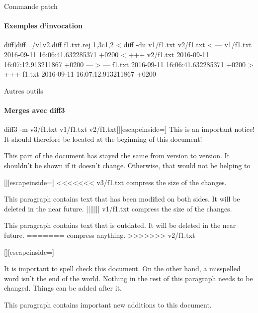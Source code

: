 \begin{frame}[fragile]{Commande patch}
\framesubtitle{Exemples d'invocation}
 \begin{snvlisting}[[normal]diff]{diff ../v1v2.diff f1.txt.rej}
1,3c1,2
< diff -du v1/f1.txt v2/f1.txt
< --- v1/f1.txt 2016-09-11 16:06:41.632285371 +0200
< +++ v2/f1.txt 2016-09-11 16:07:12.913211867 +0200
---
> --- f1.txt    2016-09-11 16:06:41.632285371 +0200
> +++ f1.txt    2016-09-11 16:07:12.913211867 +0200
 \end{snvlisting}
\end{frame}

\begin{frame}[fragile]{Autres outils}
\framesubtitle{Merges avec diff3}
\begin{tcbraster}[raster columns=3, raster valign=top]
\begin{snvlisting}{diff3 -m v3/f1.txt v1/f1.txt v2/f1.txt}[][escapeinside={}]
This is an important
notice! It should
therefore be located at
the beginning of this
document!

This part of the
document has stayed the
same from version to
version.  It shouldn't
be shown if it doesn't
change.  Otherwise, that
would not be helping to
\end{snvlisting}
\begin{snvlisting}{}[][escapeinside={}]
<<<<<<< v3/f1.txt
compress the size of the
changes.

This paragraph contains
text that has been
modified on both sides.
It will be deleted in the
near future.
||||||| v1/f1.txt
compress the size of the
changes.

This paragraph contains
text that is outdated.
It will be deleted in the
near future.
=======
compress anything.
>>>>>>> v2/f1.txt
\end{snvlisting}
\begin{snvlisting}{}[][escapeinside={}]

It is important to spell
check this document. On
the other hand, a
misspelled word isn't
the end of the world.
Nothing in the rest of
this paragraph needs to
be changed. Things can
be added after it.

This paragraph contains
important new additions
to this document.
\end{snvlisting}
\end{tcbraster}
\end{frame}


